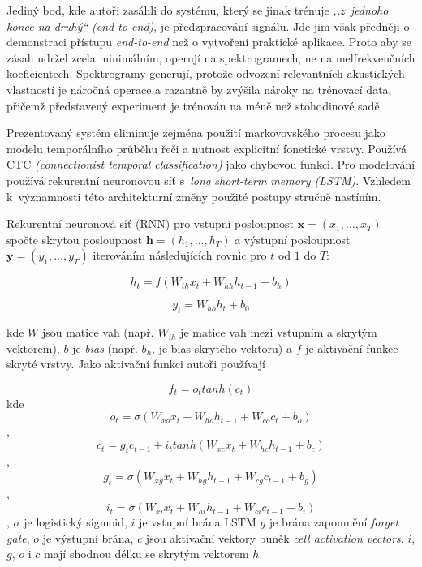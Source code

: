 Jediný bod, kde autoři zasáhli do systému, který se jinak trénuje \textit{,,z~jednoho
konce na druhý`` (end-to-end)}, je předzpracování signálu. Jde jim však předněji
o demonstraci přístupu \textit{end-to-end} než o vytvoření praktické aplikace.
Proto aby se zásah udržel zcela minimálním, operují na spektrogramech, ne na
melfrekvenčních koeficientech. Spektrogramy generují, protože odvození
relevantních akustických vlastností je náročná operace a razantně by zvýšila
nároky na trénovací data, přičemž představený experiment je trénován na méně než
stohodinové sadě.

Prezentovaný systém eliminuje zejména použití markovovského procesu jako modelu
temporálního průběhu řeči a nutnost explicitní fonetické vrstvy. Používá CTC
\textit{(connectionist temporal classification)}\cite{graves2006connectionist} jako chybovou funkci. Pro
modelování používá rekurentní neuronovou síť s~\textit{long short-term memory
(LSTM)}\cite{hochreiter1997long}. Vzhledem k~významnosti této architekturní změny použité postupy stručně
nastíním.

Rekurentní neuronová síť (RNN) pro vstupní posloupnost $\bm{x} = (x_1, ..., x_T)$
spočte skrytou posloupnost $\bm{h} = (h_1, ..., h_T)$ a výstupní posloupnost
$\bm{y} = (y_1, ..., y_T)$ iterováním následujících rovnic pro $t$ od $1$ do $T$:

\begin{equation}
h_t = f(W_{ih}x_t + W_{hh}h_{t-1} + b_h)
\end{equation}

\begin{equation}
y_t = W_{ho}h_t + b_0
\end{equation}

kde $W$ jsou matice vah (např. $W_{ih}$ je matice vah mezi vstupním a skrytým
vektorem), $b$ je \textit{bias} (např. $b_h$, je bias skrytého vektoru) a $f$ je
aktivační funkce skryté vrstvy. Jako aktivační funkci autoři používají

\begin{equation}
f_t = o_t tanh(c_t)
\end{equation}
kde
\begin{equation}
o_t = \sigma(W_{xo}x_t + W_{ho}h_{t-1} + W_{co}c_t + b_o)
\end{equation}
,
\begin{equation}
c_t = g_{t}c_{t-1} + i_t tanh(W_{xc}x_t + W_{hc}h_{t-1} + b_c)
\end{equation}
,
\begin{equation}
g_t = \sigma(W_{xg}x_t + W_{hg}h_{t-1} + W_{cg}c_{t-1} + b_g)
\end{equation}
,
\begin{equation}
i_t = \sigma(W_{xi}x_t + W_{hi}h_{t-1} + W_{ci}c_{t-1} + b_i)
\end{equation}
, $\sigma$ je logistický sigmoid, $i$ je vstupní brána LSTM $g$ je brána zapomnění
\textit{forget gate}, $o$ je výstupní brána, $c$ jsou aktivační vektory buněk
\textit{cell activation vectors}. $i$, $g$, $o$ i $c$ mají shodnou délku se
skrytým vektorem $h$.

